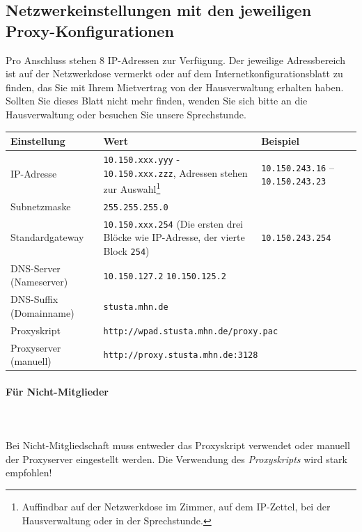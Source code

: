\documentclass[a4paper,12pt]{scrartcl}
\begin{document}
\subsection*{Netzwerkeinstellungen mit den jeweiligen Proxy-Konfigurationen}

Pro Anschluss stehen 8 IP-Adressen zur Verfügung. Der jeweilige Adressbereich ist auf der Netzwerkdose vermerkt oder auf dem Internetkonfigurationsblatt zu finden, das Sie mit Ihrem Mietvertrag von der Hausverwaltung erhalten haben. Sollten Sie dieses Blatt nicht mehr finden, wenden Sie sich bitte an die Hausverwaltung oder besuchen Sie unsere Sprechstunde. %




\begin{center}
  \begin{tabularx}{\linewidth}{|lXp{.2\linewidth}|}
    \hline
    Einstellung & Wert & Beispiel \\
    \hline \hline
    IP-Adresse & \nolinkurl{10.150.xxx.yyy} - \nolinkurl{10.150.xxx.zzz}, \newline 8 Adressen stehen zur Auswahl\footnote{Auffindbar auf der Netzwerkdose im Zimmer, auf dem IP-Zettel, bei der Hausverwaltung oder in der Sprechstunde.} & \nolinkurl{10.150.243.16} – \nolinkurl{10.150.243.23} \\
    \hline
    Subnetzmaske & \nolinkurl{255.255.255.0} & \\
    \hline
    Standardgateway & \nolinkurl{10.150.xxx.254} \newline (Die ersten drei Blöcke wie IP-Adresse, der vierte Block \nolinkurl{254}) & \nolinkurl{10.150.243.254} \\
    \hline
    DNS-Server (Nameserver) & \nolinkurl{10.150.127.2} \newline \nolinkurl{10.150.125.2} & \\
    \hline
    DNS-Suffix (Domainname) & \nolinkurl{stusta.mhn.de} & \\
    \hline
    Proxyskript & \multicolumn{2}{l|}{\nolinkurl{http://wpad.stusta.mhn.de/proxy.pac}} \\
    \hline
    Proxyserver (manuell) & \multicolumn{2}{l|}{\nolinkurl{http://proxy.stusta.mhn.de:3128}} \\
    \hline
  \end{tabularx}
\end{center}

\paragraph*{Für Nicht-Mitglieder}~\\
\\
Bei Nicht-Mitgliedschaft muss entweder das Proxyskript verwendet oder manuell der Proxyserver eingestellt werden. Die Verwendung des \emph{Proxyskripts} wird stark empfohlen!
\end{document}
